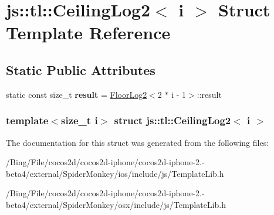 \hypertarget{structjs_1_1tl_1_1_ceiling_log2}{\section{js\-:\-:tl\-:\-:Ceiling\-Log2$<$ i $>$ Struct Template Reference}
\label{structjs_1_1tl_1_1_ceiling_log2}
}
\subsection*{Static Public Attributes}
\begin{DoxyCompactItemize}
\item 
\hypertarget{structjs_1_1tl_1_1_ceiling_log2_a23abc2d79ba408055c27aaad4f3a8184}{static const size\-\_\-t {\bfseries result} = \hyperlink{structjs_1_1tl_1_1_floor_log2}{Floor\-Log2}$<$2 $\ast$ i -\/ 1$>$\-::result}\label{structjs_1_1tl_1_1_ceiling_log2_a23abc2d79ba408055c27aaad4f3a8184}

\end{DoxyCompactItemize}
\subsubsection*{template$<$size\-\_\-t i$>$ struct js\-::tl\-::\-Ceiling\-Log2$<$ i $>$}



The documentation for this struct was generated from the following files\-:\begin{DoxyCompactItemize}
\item 
/\-Bing/\-File/cocos2d/cocos2d-\/iphone/cocos2d-\/iphone-\/2.-\/beta4/external/\-Spider\-Monkey/ios/include/js/Template\-Lib.\-h\item 
/\-Bing/\-File/cocos2d/cocos2d-\/iphone/cocos2d-\/iphone-\/2.-\/beta4/external/\-Spider\-Monkey/osx/include/js/Template\-Lib.\-h\end{DoxyCompactItemize}
